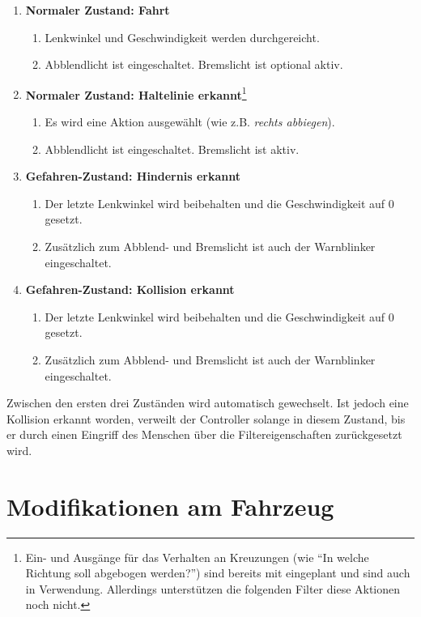 \documentclass[a4paper,12pt]{report}
\begin{document}
	\begin{enumerate}
		\item{\textbf{Normaler Zustand: Fahrt}
			\begin{enumerate}
				\item Lenkwinkel und Geschwindigkeit werden durchgereicht.
				\item Abblendlicht ist eingeschaltet. Bremslicht ist optional aktiv.
			\end{enumerate}
		}
		\item{\textbf{Normaler Zustand: Haltelinie erkannt}\footnote{Ein- und Ausgänge für das Verhalten an Kreuzungen (wie ``In welche Richtung soll abgebogen werden?'') sind bereits mit eingeplant und sind auch in Verwendung. Allerdings unterstützen die folgenden Filter diese Aktionen noch nicht.}
			\begin{enumerate}
				\item Es wird eine Aktion ausgewählt (wie z.B. \emph{rechts abbiegen}).
				\item Abblendlicht ist eingeschaltet. Bremslicht ist aktiv.
			\end{enumerate}
		}
		\item{\textbf{Gefahren-Zustand: Hindernis erkannt}
			\begin{enumerate}
				\item Der letzte Lenkwinkel wird beibehalten und die Geschwindigkeit auf $0$ gesetzt.
				\item Zusätzlich zum Abblend- und Bremslicht ist auch der Warnblinker eingeschaltet.
			\end{enumerate}
		}
		\item{\textbf{Gefahren-Zustand: Kollision erkannt}
			\begin{enumerate}
				\item Der letzte Lenkwinkel wird beibehalten und die Geschwindigkeit auf $0$ gesetzt.
				\item Zusätzlich zum Abblend- und Bremslicht ist auch der Warnblinker eingeschaltet.
			\end{enumerate}
		}
	\end{enumerate}

	Zwischen den ersten drei Zuständen wird automatisch gewechselt.
	Ist jedoch eine Kollision erkannt worden, verweilt der Controller solange in diesem Zustand, bis er durch einen Eingriff des Menschen über die Filtereigenschaften zurückgesetzt wird.

\chapter{Modifikationen am Fahrzeug}
\end{document}

